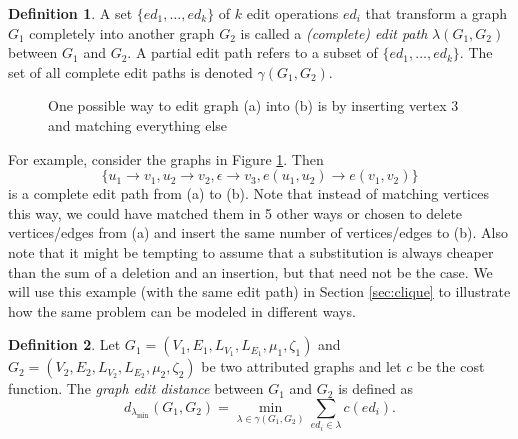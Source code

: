 \documentclass{article}
\theoremstyle{definition}
\newtheorem{definition}{Definition}
\begin{document}
\begin{definition}
  A set $\{ ed_1, \dots, ed_k \}$ of $k$ edit operations $ed_i$ that transform a graph $G_1$ completely into another graph $G_2$ is called a \emph{(complete) edit path} $\lambda(G_1, G_2)$ between $G_1$ and $G_2$. A partial edit path refers to a subset of $\{ ed_1, \dots, ed_k \}$. The set of all complete edit paths is denoted $\gamma(G_1, G_2)$.
\end{definition}
\begin{figure}
  \begin{subfigure}[t]{0.25\textwidth}
    \centering
    \caption{}
  \end{subfigure}
  \begin{subfigure}[t]{0.25\textwidth}
    \centering
    \caption{}
  \end{subfigure}
  \caption{One possible way to edit graph (a) into (b) is by inserting vertex 3 and matching everything else}
  \label{fig:example}
\end{figure}
For example, consider the graphs in Figure \ref{fig:example}. Then
\begin{equation}
\{ u_1 \to v_1, u_2 \to v_2, \epsilon \to v_3, e(u_1, u_2) \to e(v_1, v_2) \} \label{eqn:1} \tag{$\star$}
\end{equation}
is a complete edit path from (a) to (b). Note that instead of matching vertices this way, we could have matched them in 5 other ways or chosen to delete vertices/edges from (a) and insert the same number of vertices/edges to (b). Also note that it might be tempting to assume that a substitution is always cheaper than the sum of a deletion and an insertion, but that need not be the case. We will use this example (with the same edit path) in Section \ref{sec:clique} to illustrate how the same problem can be modeled in different ways.
\begin{definition}
  Let $G_1 = (V_1, E_1, L_{V_1}, L_{E_1}, \mu_1, \zeta_1)$ and $G_2 = (V_2, E_2, L_{V_2}, L_{E_2}, \mu_2, \zeta_2)$ be two attributed graphs and let $c$ be the cost function. The \emph{graph edit distance} between $G_1$ and $G_2$ is defined as
  \[ d_{\lambda_{\text{min}}}(G_1, G_2) = \min_{\lambda \in \gamma(G_1, G_2)} \sum_{ed_i \in \lambda} c(ed_i).\]
\end{definition}
\end{document}
